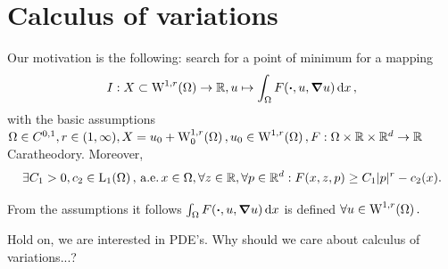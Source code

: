 \documentclass{article}
\begin{document}
\section{Calculus of variations}
\label{sec:calculus_of_variations}

Our motivation is the following: search for a point of minimum for a mapping
\[
	I: X \subset \WkpSet[1][r]{\Omega} \to \R, u \mapsto \int_{\Omega}F\qty(\vdot, u, \grad u)\dd{x},
\]
with the basic assumptions $\Omega \in C^{0,1}, r \in \qty(1, \infty), X = u_0 + \WkpzeroSet[1][r]{\Omega}, u_0 \in \WkpSet[1][r]{\Omega}, F: \Omega \times \R \times \R^d \to \R$ Caratheodory. Moreover,
\[
	\exists C_1 > 0, c_2 \in \LpSet[1]{\Omega}, \, \text{a.e.} \, x \in \Omega, \forall z \in \R, \forall p \in \R^d : F\qty(x,z,p)\geq C_1|p|^r - c_2(x).
\]

\begin{remark}
	From the assumptions it follows $\int_{\Omega}F\qty(\vdot, u, \grad u)\dd{x}$ is defined $\forall u \in \WkpSet[1][r]{\Omega}.$
\end{remark}

Hold on, we are interested in PDE's. Why should we care about calculus of variations...?
\end{document}
